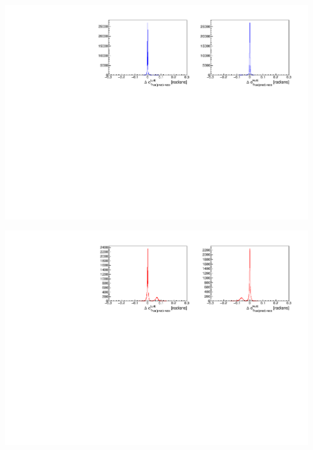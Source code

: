 \documentclass[8pt]{beamer}
\begin{document}
\begin{frame}
	\includegraphics[width=\textwidth]{VBilder/b2b_DataP3}
	
	\includegraphics[width=\textwidth]{VBilder/b2b_MCP3}
\end{frame}
\end{document}
